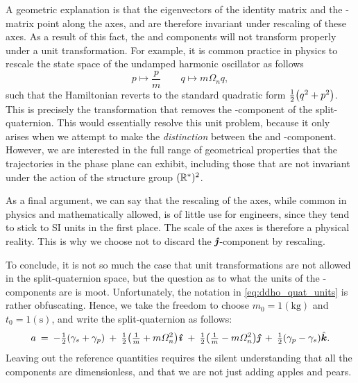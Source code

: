 A geometric explanation is that the eigenvectors of the identity matrix and the \quatk-matrix point along the axes, and are therefore invariant under rescaling of these axes. As a result of this fact, the \quati and \quatj components will not transform properly under a unit transformation. For example, it is common practice in physics to rescale the state space of the undamped harmonic oscillator as follows \cite{Dekker1981,Dedene1980}
\begin{equation}
     p \mapsto \frac{p}{m} \qquad q \mapsto m\Omega_n q,
\end{equation}
such that the Hamiltonian reverts to the standard quadratic form $\tfrac{1}{2}\qty(q^2 + p^2)$. This is precisely the transformation that removes the \quatj-component of the split-quaternion. This would essentially resolve this unit problem, because it only arises when we attempt to make the \emph{distinction} between the \quati and \quatj-component.
However, we are interested in the full range of geometrical properties that the trajectories in the phase plane can exhibit, including those that are not invariant under the action of the structure group \((\mathbb{R}^*)^2\). %

As a final argument, we can say that the rescaling of the axes, while common in physics and mathematically allowed, is of little use for engineers, since they tend to stick to SI units in the first place. The scale of the axes is therefore a physical reality. This is why we choose not to discard the \(\quatj\)-component by rescaling.

To conclude, it is not so much the case that unit transformations are not allowed in the split-quaternion space, but the question as to what the units of the \quatj-components are is moot. Unfortunately, the notation in \cref{eq:ddho_quat_units} is rather obfuscating. Hence, we take the freedom to choose \(m_0 = 1 (\si{\kilogram})\) and \(t_0 = 1 (\si{\second})\), and write the split-quaternion as follows:
\begin{equation}
    a\:=\: -\tfrac{1}{2}\qty(\gamma_s + \gamma_p)\:+\:\tfrac{1}{2}\qty(\tfrac{1}{m} + m\Omega_n^2)\quati\:+\:\tfrac{1}{2}\qty(\tfrac{1}{m} - m\Omega_n^2)\quatj\:+\:\tfrac{1}{2}\qty(\gamma_p - \gamma_s)\quatk. 
    \label{eq:ddho_quat}
\end{equation}
Leaving out the reference quantities requires the silent understanding that all the components are dimensionless, and that we are not just adding apples and pears. 

